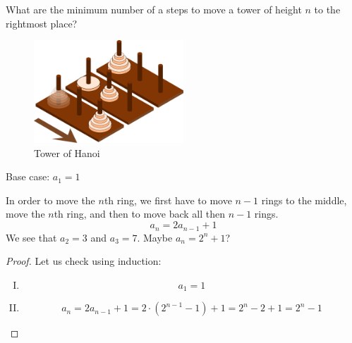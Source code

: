 \documentclass[00_complete]{subfiles}
\begin{document}
\begin{example}
    What are the minimum number of a steps to move a tower of height $n$ to the rightmost
    place?

    \begin{figure}[ht]
  \centering
    \includegraphics[width=0.5\textwidth]{w8-tower}
    \caption{Tower of Hanoi}
\end{figure}

    Base case: $a_1=1$

    In order to move the $n$th ring, we first have to move $n-1$ rings to the
    middle, move the $n$th ring, and then to move back all then $n-1$ rings.
    $$a_n=2a_{n-1}+1$$
    We see that $a_2=3$ and $a_3=7$. Maybe $a_n = 2^n+1$?
    \begin{proof}
    Let us check using induction:
    \begin{enumerate}[I.]
        \item \begin{equation}
            a_1=1 \tag{\checkmark}
        \end{equation}
        \item \begin{equation}
            a_n = 2a_{n-1}+1=2\cdot(2^{n-1}-1)+1=2^n-2+1=2^n-1
            \tag{\checkmark}
        \end{equation}
    \end{enumerate}
    \end{proof}
\end{example}
\end{document}
